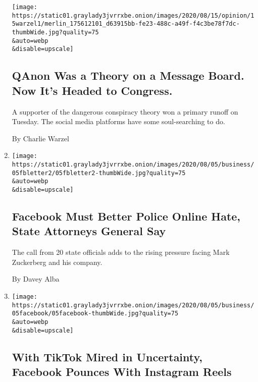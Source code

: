 \begin{enumerate}
  \texttt{[image: https://static01.graylady3jvrrxbe.onion/images/2020/08/15/opinion/15warzel1/merlin\_175612101\_d63915bb-fe23-488c-a49f-f4c3be78f7dc-thumbWide.jpg?quality=75\\\&auto=webp\\\&disable=upscale]}

  \hypertarget{qanon-was-a-theory-on-a-message-board-now-its-headed-to-congress}{%
  \subsection{QAnon Was a Theory on a Message Board. Now It's Headed to
  Congress.}\label{qanon-was-a-theory-on-a-message-board-now-its-headed-to-congress}}

  A supporter of the dangerous conspiracy theory won a primary runoff on
  Tuesday. The social media platforms have some soul-searching to do.

  By Charlie Warzel
\item
  \href{/2020/08/05/technology/facebook-online-hate.html}{}

  \texttt{[image: https://static01.graylady3jvrrxbe.onion/images/2020/08/05/business/05fbletter2/05fbletter2-thumbWide.jpg?quality=75\\\&auto=webp\\\&disable=upscale]}

  \hypertarget{facebook-must-better-police-online-hate-state-attorneys-general-say}{%
  \subsection{Facebook Must Better Police Online Hate, State Attorneys
  General
  Say}\label{facebook-must-better-police-online-hate-state-attorneys-general-say}}

  The call from 20 state officials adds to the rising pressure facing
  Mark Zuckerberg and his company.

  By Davey Alba
\item
  \href{/2020/08/05/technology/tiktok-facebook-instagram-reels.html}{}

  \texttt{[image: https://static01.graylady3jvrrxbe.onion/images/2020/08/05/business/05facebook/05facebook-thumbWide.jpg?quality=75\\\&auto=webp\\\&disable=upscale]}

  \hypertarget{with-tiktok-mired-in-uncertainty-facebook-pounces-with-instagram-reels}{%
  \subsection{With TikTok Mired in Uncertainty, Facebook Pounces With
  Instagram
  Reels}\label{with-tiktok-mired-in-uncertainty-facebook-pounces-with-instagram-reels}}


\end{enumerate}
